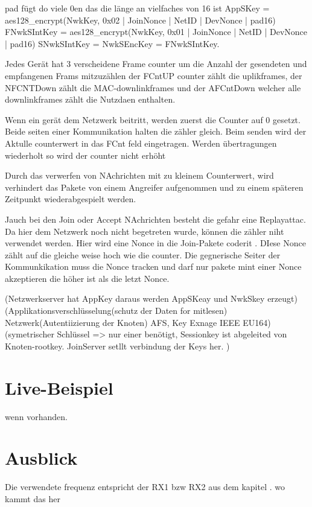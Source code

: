 \documentclass[a4paper,12pt]{article}
\begin{document}
        pad fügt do viele 0en das die länge an vielfaches von 16 ist
        AppSKey = aes128\_encrypt(NwkKey, 0x02 | JoinNonce | NetID | DevNonce | pad16) 
        FNwkSIntKey = aes128\_encrypt(NwkKey, 0x01 | JoinNonce | NetID | DevNonce | pad16)
        SNwkSIntKey = NwkSEncKey = FNwkSIntKey.

        \bigbreak

        Jedes Gerät hat 3 verscheidene Frame counter um die Anzahl der gesendeten und empfangenen Frams mitzuzählen der FCntUP counter zählt die
        uplikframes, der NFCNTDown zählt die MAC-downlinkframes und der AFCntDown welcher alle downlinkframes zählt die Nutzdaen enthalten.

        Wenn ein gerät dem Netzwerk beitritt, werden zuerst die Counter auf 0 gesetzt. Beide seiten einer Kommunikation halten die zähler gleich. 
        Beim senden wird der Aktulle counterwert in das FCnt feld eingetragen. Werden übertragungen wiederholt so wird der counter nicht erhöht 

        Durch das verwerfen von NAchrichten mit zu kleinem Counterwert, wird verhindert das Pakete von einem Angreifer aufgenommen und zu einem späteren Zeitpunkt wiederabgespielt werden.
        
        Jauch bei den Join oder Accept NAchrichten besteht die gefahr eine Replayattac. Da hier dem Netzwerk noch nicht begetreten wurde, können die zähler niht verwendet werden. Hier wird eine Nonce in die 
        Join-Pakete coderit . DIese Nonce zählt auf die gleiche weise hoch wie die counter. Die gegnerische Seiter der Kommunkikation muss die Nonce tracken und darf nur pakete mint einer Nonce akzeptieren die höher ist als die letzt Nonce.
       
        \cite{LoRaSecur}(Netzwerkserver hat AppKey daraus werden AppSKeay und NwkSkey erzeugt)
        \cite{WhatIsLoRa}(Applikationsverschlüsselung(schutz der Daten for mitlesen) Netzwerk(Autentiizierung der Knoten) AFS, Key Exnage IEEE EU164)
        \cite{LoRaSpec}(symetrischer Schlüssel => nur einer benötigt, Sessionkey ist abgeleited von Knoten-rootkey. JoinServer setllt verbindung der Keys her.
        )
    \section{Live-Beispiel}
        wenn vorhanden.

    \section{Ausblick}
     Die verwendete frequenz entspricht der RX1 bzw RX2 aus dem kapitel . wo kammt das her
\end{document}
